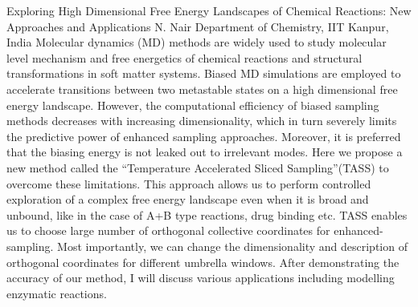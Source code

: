 
    \begin{abstract_online}{Exploring High Dimensional Free Energy Landscapes of Chemical Reactions: New Approaches and Applications}{%
        N. Nair}{%
        \IStag}{%
        Department of Chemistry, IIT Kanpur, India}
    Molecular dynamics (MD) methods are widely used to study molecular level mechanism and free energetics of chemical reactions and structural transformations in soft matter systems. Biased MD simulations are employed to accelerate transitions between two metastable states on a high dimensional free energy landscape. However, the computational efficiency of biased sampling methods decreases with increasing dimensionality, which in turn severely limits the predictive power of enhanced sampling approaches. Moreover, it is preferred that the biasing energy is not leaked out to irrelevant modes. Here we propose a new method called the “Temperature Accelerated Sliced Sampling”(TASS) to overcome these limitations. This approach allows us to perform controlled exploration of a complex free energy landscape even when it is broad and unbound, like in the case of A+B type reactions, drug binding etc. TASS enables us to choose large number of orthogonal collective coordinates for enhanced-sampling. Most importantly, we can change the dimensionality and description of orthogonal coordinates for different umbrella windows. After demonstrating the accuracy of our method, I will discuss various applications including modelling enzymatic reactions. 
    
    \end{abstract_online}
    